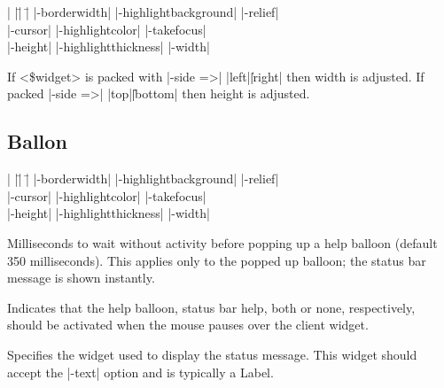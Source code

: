 \begin{tabbing}
|                   |\=|                     |\= \kill
|-borderwidth|      \> |-highlightbackground| \> |-relief| \\
|-cursor|           \> |-highlightcolor|      \> |-takefocus| \\
|-height|	    \> |-highlightthickness|  \> |-width| \\
\end{tabbing}

\vskip5pt

\begin{enum}{1cm}

If <\$widget> is packed with |-side =>| |left|\||right| then width is adjusted.
If packed |-side =>| |top|\||bottom| then height is adjusted. 

\end{enum}

\subsection*{Ballon}
\vspace{-4pt}

\begin{tabbing}
|                   |\=|                     |\= \kill
|-borderwidth| \> |-highlightbackground|     \> |-relief| \\   
|-cursor|      \> |-highlightcolor|          \> |-takefocus| \\
|-height|      \> |-highlightthickness|      \> |-width| \\
\end{tabbing}

\vskip5pt

\begin{enum}{1cm}

Milliseconds to wait without activity before popping up a help balloon
(default 350 milliseconds). This applies only to the popped up
balloon; the status bar message is shown instantly. 

Indicates that the help balloon, status bar help, both or none, respectively,
should be activated when the mouse pauses over the client widget. 

Specifies the widget used to display the status message. This widget should accept the
|-text| option and is typically a Label. 

\end{enum}

